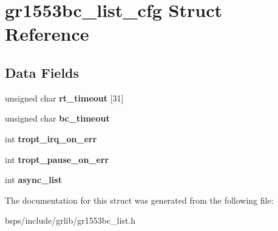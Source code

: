\hypertarget{structgr1553bc__list__cfg}{}\section{gr1553bc\+\_\+list\+\_\+cfg Struct Reference}
\label{structgr1553bc__list__cfg}
\subsection*{Data Fields}
\begin{DoxyCompactItemize}
\item 
\mbox{\label{structgr1553bc__list__cfg_a88b85cdc7a2883a3eab312a4445748da}} 
unsigned char {\bfseries rt\+\_\+timeout} \mbox{[}31\mbox{]}
\item 
\mbox{\label{structgr1553bc__list__cfg_a6c92f25505e4d2105870a5a344d3dbc0}} 
unsigned char {\bfseries bc\+\_\+timeout}
\item 
\mbox{\label{structgr1553bc__list__cfg_a980a98eff6c921b00653282dfe040915}} 
int {\bfseries tropt\+\_\+irq\+\_\+on\+\_\+err}
\item 
\mbox{\label{structgr1553bc__list__cfg_ad004f31867983df764030ac03def81c3}} 
int {\bfseries tropt\+\_\+pause\+\_\+on\+\_\+err}
\item 
\mbox{\label{structgr1553bc__list__cfg_ae3a66be588c4d85fc05d60e19153c962}} 
int {\bfseries async\+\_\+list}
\end{DoxyCompactItemize}


The documentation for this struct was generated from the following file\+:\begin{DoxyCompactItemize}
\item 
bsps/include/grlib/gr1553bc\+\_\+list.\+h\end{DoxyCompactItemize}
